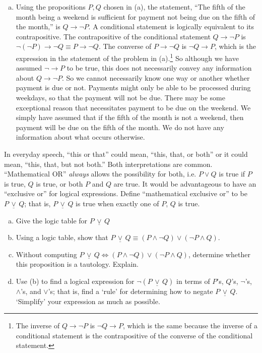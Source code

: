 \documentclass[11pt,letterpaper]{article}
\newcommand{\xor}{\,\underline{\vee}\,}
\begin{document}
\begin{enumerate}[(a)]
\item Using the propositions $P, Q$ chosen in (a), the statement, ``The fifth of the month being a weekend is sufficient for payment not being due on the fifth of the month,'' is $Q \to \neg P$. A conditional statement is logically equivalent to its contrapositive. The contrapositive of the conditional statement $Q \to \neg P$ is $\neg (\neg P) \to \neg Q \equiv P \to \neg Q$. The converse of $P \to \neg Q$ is $\neg Q \to P$, which is the expression in the statement of the problem in (a).\footnote{The inverse of $Q \to \neg P$ is $\neg Q \to P$, which is the same because the inverse of a conditional statement is the contrapositive of the converse of the conditional statement.} So although we have assumed $\neg \to P$ to be true, this does not necessarily convey any information about $Q \to \neg P$. So we cannot necessarily know one way or another whether payment is due or not. Payments might only be able to be processed during weekdays, so that the payment will not be due. There may be some exceptional reason that necessitates payment to be due on the weekend. We simply have assumed that if the fifth of the month is not a weekend, then payment will be due on the fifth of the month. We do not have any information about what occurs otherwise. 
\end{enumerate}



\newpage



 In everyday speech, ``this or that'' could mean, ``this, that, or both'' or it could mean, ``this, that, but not both.'' Both interpretations are common. ``Mathematical OR'' \textit{always} allows the possibility for both, i.e. $P \vee Q$ is true if $P$ is true, $Q$ is true, or both $P$ and $Q$ are true. It would be advantageous to have an ``exclusive or'' for logical expressions. Define ``mathematical exclusive or'' to be $P \xor Q$; that is, $P \xor Q$ is true when exactly one of $P$, $Q$ is true. 
	\begin{enumerate}[(a)]
	\item Give the logic table for $P \xor Q$
	\item Using a logic table, show that $P \xor Q \equiv (P \wedge \neg Q) \vee (\neg P \wedge Q)$.
	\item Without computing $P \xor Q \iff (P \wedge \neg Q) \vee (\neg P \wedge Q)$, determine whether this proposition is a tautology. Explain. 
	\item Use (b) to find a logical expression for $\neg (P \xor Q)$ in terms of $P$'s, $Q$'s, $\neg$'s, $\wedge$'s, and $\vee$'s; that is, find a `rule' for determining how to negate $P \xor Q$. `Simplify' your expression as much as possible. 	
	\end{enumerate} \pspace
\end{document}
